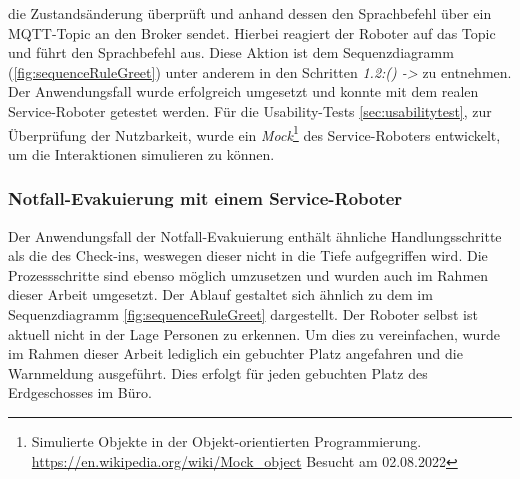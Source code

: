         die Zustandsänderung überprüft und anhand dessen den Sprachbefehl über ein \acs{MQTT}-Topic an den Broker sendet. Hierbei reagiert der Roboter auf das Topic und führt 
        den Sprachbefehl aus. Diese Aktion ist dem Sequenzdiagramm (\ref{fig:sequenceRuleGreet}) unter anderem in den Schritten \textit{1.2:() ->} zu entnehmen. 
        \\
        Der Anwendungsfall wurde erfolgreich umgesetzt und konnte mit dem realen Service-Roboter getestet werden. Für die 
        Usability-Tests \ref{sec:usabilitytest}, zur Überprüfung der Nutzbarkeit, wurde ein \textit{Mock}\footnote{Simulierte Objekte in der Objekt-orientierten Programmierung. \url{https://en.wikipedia.org/wiki/Mock_object} Besucht am 02.08.2022} 
        des Service-Roboters entwickelt, um die Interaktionen simulieren zu können.
    
    \subsubsection*{Notfall-Evakuierung mit einem Service-Roboter}
        Der Anwendungsfall der Notfall-Evakuierung enthält ähnliche Handlungsschritte als die des Check-ins, weswegen dieser nicht in die 
        Tiefe aufgegriffen wird. Die Prozessschritte sind ebenso möglich umzusetzen und wurden auch im Rahmen dieser 
        Arbeit umgesetzt. Der Ablauf gestaltet sich ähnlich zu dem im Sequenzdiagramm \ref{fig:sequenceRuleGreet} dargestellt. 
        Der Roboter selbst ist aktuell nicht in der Lage Personen zu erkennen. Um dies zu vereinfachen, wurde im Rahmen dieser Arbeit 
        lediglich ein gebuchter Platz angefahren und die Warnmeldung ausgeführt. Dies erfolgt für jeden gebuchten Platz des Erdgeschosses 
        im Büro.
        
